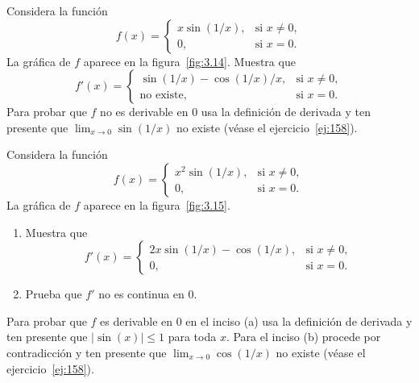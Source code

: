 \documentclass[12pt,a4paper]{book}
\begin{document}
    \begin{ejercicio}\label{ej:258}
        Considera la función
        \begin{equation*}
            f(x)=\begin{cases}
                x\sin(1/x), & \text{si }x\neq 0,\\
                0, & \text{si }x=0.
            \end{cases}
        \end{equation*}
        La gráfica de $f$ aparece en la figura~\ref{fig:3.14}. Muestra que
        \begin{equation*}
            f'(x)=\begin{cases}
                \sin(1/x)-\cos(1/x)/x, & \text{si }x\neq 0,\\
                \text{no existe}, & \text{si }x=0.
            \end{cases}
        \end{equation*}
        \sugerencia Para probar que $f$ no es derivable en $0$ usa la definición de
        derivada y ten presente que $\lim_{x\to 0}\sin(1/x)$ no existe (véase el ejercicio~\ref{ej:158}).
    \end{ejercicio}

    \begin{ejercicio}\label{ej:259}
        Considera la
        función
        \begin{equation*}
            f(x)=\begin{cases}
                x^{2}\sin(1/x), & \text{si }x\neq 0,\\
                0, & \text{si }x=0.
            \end{cases}
        \end{equation*}
        La gráfica de $f$ aparece en la figura~\ref{fig:3.15}.
        \begin{enumerate}
            \item Muestra que
            \begin{equation*}
                f'(x)=\begin{cases}
                    2x\sin(1/x)-\cos(1/x), & \text{si }x\neq 0,\\
                    0, & \text{si }x=0.
                \end{cases}
            \end{equation*}
            \item Prueba que $f'$ no es continua en $0$.
        \end{enumerate}
        \sugerencia Para probar que $f$ es derivable en $0$ en el inciso (a) usa la
        definición de derivada y ten presente que $|\sin(x)|\leq 1$ para toda $x$. Para el
        inciso (b) procede por contradicción y ten presente que $\lim_{x\to 0}\cos(1/x)$ no
        existe (véase el ejercicio~\ref{ej:158}).
    \end{ejercicio}
\end{document}
